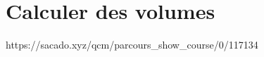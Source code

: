 

% 
% 


% 




\chapter{Calculer des volumes}
{https://sacado.xyz/qcm/parcours_show_course/0/117134}

%


